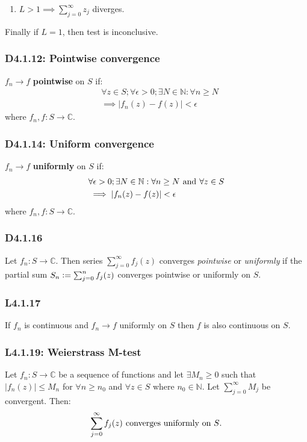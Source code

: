\documentclass{article}
\newcommand{\deq}{\vcentcolon=}
\begin{document}
\begin{multicols*}{3}
\begin{enumerate}
    \item $L>1\implies\sum_{j=0}^{\infty}z_j$ diverges.
\end{enumerate}
Finally if $L=1$, then test is inconclusive.

\subsubsection*{D4.1.12: Pointwise convergence}
$f_n\rightarrow f$ \textbf{pointwise} on $S$ if:
\begin{align*}
    &\forall z\in S;\forall\epsilon>0;\exists N\in\mathbb{N}:
    \forall n\geq N \\
    &\implies |f_n(z)-f(z)|<\epsilon
\end{align*}
where $f_n,f:S\rightarrow\mathbb{C}$.

\subsubsection*{D4.1.14: Uniform convergence}
$f_n\rightarrow f$ \textbf{uniformly} on $S$ if:
\begin{align*}
    &\forall\epsilon>0;\exists N\in\mathbb{N}:
    \forall n\geq N\hspace{0.05in}\text{and}\hspace{0.05in}
    \forall z\in S \\
    &\implies |f_n(z)-f(z)|<\epsilon
\end{align*}
where $f_n,f:S\rightarrow\mathbb{C}$.

\subsubsection*{D4.1.16}
Let $f_n:S\rightarrow\mathbb{C}$. Then series
$\sum_{j=0}^{\infty}f_j(z)$ converges
\textit{pointwise} or \textit{uniformly} if the
partial sum $S_n\deq\sum_{j=0}^{n}f_j(z)$ converges
pointwise or uniformly on $S$.

\subsubsection*{L4.1.17}
If $f_n$ is continuous and $f_n\rightarrow f$ uniformly on $S$
then $f$ is also continuous on $S$.

\subsubsection*{L4.1.19: Weierstrass M-test}
Let $f_n:S\rightarrow\mathbb{C}$ be a sequence of functions
and let $\exists M_n\geq0$ such that $|f_n(z)|\leq M_n$ for
$\forall n\geq n_0$ and $\forall z\in S$ where $n_0\in\mathbb{N}$.
Let $\sum_{j=0}^{\infty}M_j$ be convergent. Then:
$$\sum_{j=0}^{\infty}f_j(z)\hspace{0.05in}
\text{converges uniformly on $S$}.$$


\end{multicols*}
\end{document}
